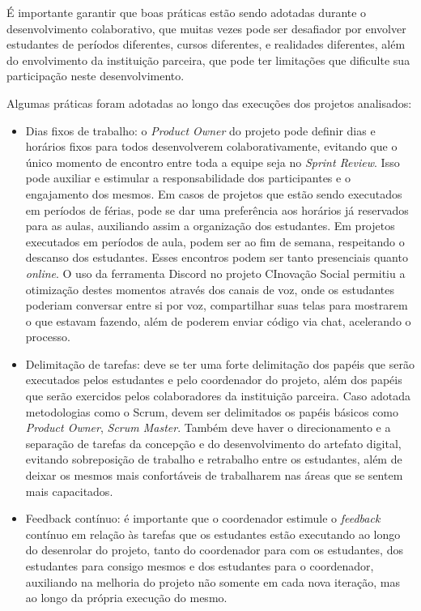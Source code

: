 É importante garantir que boas práticas estão sendo adotadas durante o desenvolvimento colaborativo, que muitas vezes pode ser desafiador por envolver estudantes de períodos diferentes, cursos diferentes, e realidades diferentes, além do envolvimento da instituição parceira, que pode ter limitações que dificulte sua participação neste desenvolvimento.

Algumas práticas foram adotadas ao longo das execuções dos projetos analisados:
\begin{itemize}
    \item Dias fixos de trabalho: o \textit{Product Owner} do projeto pode definir dias e horários fixos para todos desenvolverem colaborativamente, evitando que o único momento de encontro entre toda a equipe seja no \textit{Sprint Review}. Isso pode auxiliar e estimular a responsabilidade dos participantes e o engajamento dos mesmos. Em casos de projetos que estão sendo executados em períodos de férias, pode se dar uma preferência aos horários já reservados para as aulas, auxiliando assim a organização dos estudantes. Em projetos executados em períodos de aula, podem ser ao fim de semana, respeitando o descanso dos estudantes. Esses encontros podem ser tanto presenciais quanto \textit{online}. O uso da ferramenta Discord no projeto CInovação Social permitiu a otimização destes momentos através dos canais de voz, onde os estudantes poderiam conversar entre si por voz, compartilhar suas telas para mostrarem o que estavam fazendo, além de poderem enviar código via chat, acelerando o processo.
    
    \item Delimitação de tarefas: deve se ter uma forte delimitação dos papéis que serão executados pelos estudantes e pelo coordenador do projeto, além dos papéis que serão exercidos pelos colaboradores da instituição parceira. Caso adotada metodologias como o Scrum, devem ser delimitados os papéis básicos como \textit{Product Owner}, \textit{Scrum Master}. Também deve haver o direcionamento e a separação de tarefas da concepção e do desenvolvimento do artefato digital, evitando sobreposição de trabalho e retrabalho entre os estudantes, além de deixar os mesmos mais confortáveis de trabalharem nas áreas que se sentem mais capacitados.

    \item Feedback contínuo: é importante que o coordenador estimule o \textit{feedback} contínuo em relação às tarefas que os estudantes estão executando ao longo do desenrolar do projeto, tanto do coordenador para com os estudantes, dos estudantes para consigo mesmos e dos estudantes para o coordenador, auxiliando na melhoria do projeto não somente em cada nova iteração, mas ao longo da própria execução do mesmo.

\end{itemize}